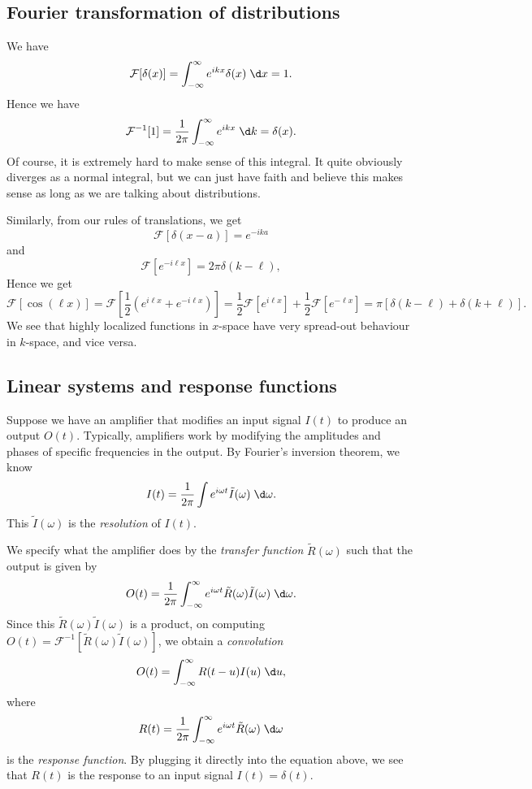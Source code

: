 \documentclass[a4paper]{article}
\begin{document}
\subsection{Fourier transformation of distributions}
We have
\[
  \mathcal{F}[\delta(x)] = \int_{-\infty}^\infty e^{ikx} \delta (x)\;\d x = 1.
\]
Hence we have
\[
  \mathcal{F}^{-1}[1] = \frac{1}{2\pi} \int_{-\infty}^\infty e^{ikx}\;\d k = \delta (x).
\]
Of course, it is extremely hard to make sense of this integral. It quite obviously diverges as a normal integral, but we can just have faith and believe this makes sense as long as we are talking about distributions.

Similarly, from our rules of translations, we get
\[
  \mathcal{F}[\delta(x - a)] = e^{-ika}
\]
and
\[
  \mathcal{F}[e^{-i\ell x}] = 2\pi \delta(k - \ell),
\]
Hence we get
\[
  \mathcal{F}[\cos (\ell x)] = \mathcal{F}\left[\frac{1}{2}( e^{i\ell x} + e^{-i\ell x})\right] = \frac{1}{2} \mathcal{F}[e^{i\ell x}] + \frac{1}{2} \mathcal{F}[e^{-\ell x}] = \pi [\delta (k - \ell) + \delta(k + \ell)].
\]
We see that highly localized functions in $x$-space have very spread-out behaviour in $k$-space, and vice versa.

\subsection{Linear systems and response functions}
Suppose we have an amplifier that modifies an input signal $I(t)$ to produce an output $O(t)$. Typically, amplifiers work by modifying the amplitudes and phases of specific frequencies in the output. By Fourier's inversion theorem, we know
\[
  I(t) = \frac{1}{2\pi} \int e^{i\omega t} \tilde{I}(\omega) \;\d \omega.
\]
This $\tilde{I}(\omega)$ is the \emph{resolution} of $I(t)$.

We specify what the amplifier does by the \emph{transfer function} $\tilde{R}(\omega)$ such that the output is given by
\[
  O(t) = \frac{1}{2\pi} \int_{-\infty}^\infty e^{i\omega t} \tilde{R}(\omega) \tilde{I}(\omega)\;\d \omega.
\]
Since this $\tilde{R}(\omega) \tilde{I}(\omega)$ is a product, on computing $O(t) = \mathcal{F}^{-1}[\tilde{R}(\omega) \tilde{I}(\omega)]$, we obtain a \emph{convolution}
\[
  O(t) = \int_{-\infty}^\infty R(t - u) I(u)\;\d u,
\]
where
\[
  R(t) = \frac{1}{2\pi} \int_{-\infty}^\infty e^{i\omega t} \tilde{R}(\omega) \;\d \omega
\]
is the \emph{response function}. By plugging it directly into the equation above, we see that $R(t)$ is the response to an input signal $I(t) = \delta(t)$.
\end{document}
